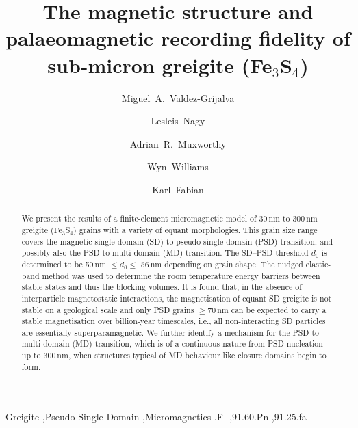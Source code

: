 \documentclass[review,authoryear]{elsarticle}
\newcommand{\nm}{\,\text{nm}}
\begin{document}
\allowdisplaybreaks

\begin{frontmatter}

\title{The magnetic structure and palaeomagnetic recording fidelity of sub-micron greigite (Fe$_3$S$_4$)}

\author[ic]{Miguel~A.~Valdez-Grijalva}

\author[ed]{Lesleis~Nagy}
\author[ic]{Adrian~R.~Muxworthy}
\author[ed]{Wyn~Williams}
\author[kf]{Karl~Fabian}

\address[ic]{Department of Earth Science and Engineering, Imperial College London, SW7 2BP, UK}
\address[ed]{School of GeoSciences, University of Edinburgh, EH9 3FE, UK}
\address[kf]{Geological Survey of Norway, N-7491, Norway}

\begin{abstract}
We present the results of a finite-element micromagnetic model of 30$\nm$ to 300$\nm$ greigite (Fe$_3$S$_4$) grains with a variety of equant morphologies. This grain size range covers the magnetic single-domain (SD) to pseudo single-domain (PSD) transition, and possibly also the PSD to multi-domain (MD) transition. The SD--PSD threshold $d_0$ is determined to be 50$\nm$ $\leq d_0 \leq$ 56$\nm$ depending on grain shape. The nudged elastic-band method was used to determine the room temperature energy barriers between stable states and thus the blocking volumes. It is found that, in the absence of interparticle magnetostatic interactions, the magnetisation of equant SD greigite is not stable on a geological scale and only PSD grains $\geq 70\,\text{nm}$ can be expected to carry a stable magnetisation over billion-year timescales, i.e., all non-interacting SD particles are essentially superparamagnetic. We further identify a mechanism for the PSD to multi-domain (MD) transition, which is of a continuous nature from PSD nucleation up to 300$\nm$, when structures typical of MD behaviour like closure domains begin to form.
\end{abstract}

\begin{keyword}
Greigite \sep Pseudo Single-Domain \sep Micromagnetics
.F- \sep 91.60.Pn \sep 91.25.fa
\end{keyword}

\end{frontmatter}

\linenumbers
\end{document}
